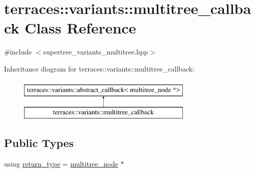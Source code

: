 \hypertarget{classterraces_1_1variants_1_1multitree__callback}{}\section{terraces\+:\+:variants\+:\+:multitree\+\_\+callback Class Reference}
\label{classterraces_1_1variants_1_1multitree__callback}


{\ttfamily \#include $<$supertree\+\_\+variants\+\_\+multitree.\+hpp$>$}

Inheritance diagram for terraces\+:\+:variants\+:\+:multitree\+\_\+callback\+:\begin{figure}[H]
\begin{center}
\leavevmode
\includegraphics[height=2.000000cm]{classterraces_1_1variants_1_1multitree__callback}
\end{center}
\end{figure}
\subsection*{Public Types}
\begin{DoxyCompactItemize}
\item 
using \hyperlink{classterraces_1_1variants_1_1multitree__callback_a31341dbe798daa06859cd3e0ab354bf1}{return\+\_\+type} = \hyperlink{structterraces_1_1multitree__node}{multitree\+\_\+node} $\ast$
\end{DoxyCompactItemize}
